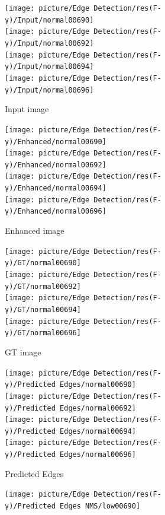 \documentclass[a4paper]{ctexart}
\begin{document}
	\begin{figure}[htbp]
		\centering
		\begin{subfigure}{0.16\textwidth}
			\texttt{[image: picture/Edge Detection/res(F-γ)/Input/normal00690]} \\
			\texttt{[image: picture/Edge Detection/res(F-γ)/Input/normal00692]} \\
			\texttt{[image: picture/Edge Detection/res(F-γ)/Input/normal00694]} \\
			\texttt{[image: picture/Edge Detection/res(F-γ)/Input/normal00696]}
			\caption{Input image}
		\end{subfigure}
		\begin{subfigure}{0.16\textwidth}
			\texttt{[image: picture/Edge Detection/res(F-γ)/Enhanced/normal00690]} \\
			\texttt{[image: picture/Edge Detection/res(F-γ)/Enhanced/normal00692]} \\
			\texttt{[image: picture/Edge Detection/res(F-γ)/Enhanced/normal00694]} \\
			\texttt{[image: picture/Edge Detection/res(F-γ)/Enhanced/normal00696]}
			\caption{Enhanced image}
		\end{subfigure}
		\begin{subfigure}{0.16\textwidth}
			\texttt{[image: picture/Edge Detection/res(F-γ)/GT/normal00690]} \\
			\texttt{[image: picture/Edge Detection/res(F-γ)/GT/normal00692]} \\
			\texttt{[image: picture/Edge Detection/res(F-γ)/GT/normal00694]} \\
			\texttt{[image: picture/Edge Detection/res(F-γ)/GT/normal00696]}
			\caption{GT image}
		\end{subfigure}
		\begin{subfigure}{0.16\textwidth}
			\texttt{[image: picture/Edge Detection/res(F-γ)/Predicted Edges/normal00690]} \\
			\texttt{[image: picture/Edge Detection/res(F-γ)/Predicted Edges/normal00692]} \\
			\texttt{[image: picture/Edge Detection/res(F-γ)/Predicted Edges/normal00694]} \\
			\texttt{[image: picture/Edge Detection/res(F-γ)/Predicted Edges/normal00696]}
			\caption{Predicted Edges}
		\end{subfigure}
		\begin{subfigure}{0.16\textwidth}
			\texttt{[image: picture/Edge Detection/res(F-γ)/Predicted Edges NMS/low00690]} \\

\end{subfigure}
\end{figure}
\end{document}
